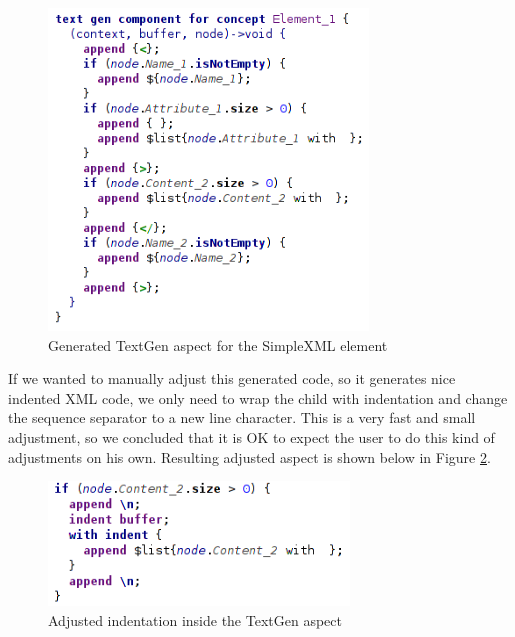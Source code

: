 \begin{figure}[h]
	\centering
	\includegraphics[width=85mm]{./img/textgen_final.png}
	\caption{Generated TextGen aspect for the SimpleXML element}
	\label{fig:textgen_final}
\end{figure}

If we wanted to manually adjust this generated code, so it generates nice indented XML code, we only need to wrap the  child with indentation and change the sequence separator to a new line character.
This is a very fast and small adjustment, so we concluded that it is OK to expect the user to do this kind of adjustments on his own.
Resulting adjusted aspect is shown below in Figure \ref{fig:textgen_adjusted}.

\begin{figure}[ht]
	\centering
	\includegraphics[width=80mm]{./img/textgen_adjusted.png}
	\caption{Adjusted indentation inside the TextGen aspect}
	\label{fig:textgen_adjusted}
\end{figure}